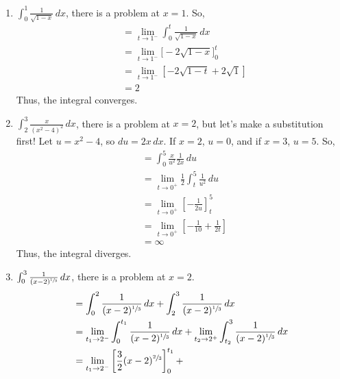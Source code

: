 \begin{Example}{}{}
    \begin{enumerate}[label=(\roman*)]
        \item $ \int_{0}^{1} \frac{1}{\sqrt{1-x}} \, d{x} $, there is a problem at $ x=1 $. So,
              \begin{align*}
                   & =\lim\limits_{{t} \to {1^-}} \int_{0}^{t} \frac{1}{\sqrt{1-x}} \, d{x} \\
                   & =\lim\limits_{{t} \to {1^-}}\bigl[-2\sqrt{1-x}\bigr]_0^t               \\
                   & =\lim\limits_{{t} \to {1^-}}[-2\sqrt{1-t}+2\sqrt{1}]                   \\
                   & =2
              \end{align*}
              Thus, the integral converges.
        \item $ \int_{2}^{3} \frac{x}{(x^2-4)^2}\, d{x}  $, there is a problem at $ x=2 $,
              but let's make a substitution first! Let $ u=x^2-4 $, so $ du=2x\,dx $. If $ x=2 $,
              $ u=0 $, and if $ x=3 $, $ u=5 $. So,
              \begin{align*}
                   & =\int_{0}^{5} \frac{x}{u^2} \frac{1}{2x} \, d{u}                           \\
                   & =\lim\limits_{{t} \to {0^+}} \frac{1}{2} \int_{t}^{5} \frac{1}{u^2}\, d{u} \\
                   & =\lim\limits_{{t} \to {0^+}}\left[-\frac{1}{2u} \right]_t^5                \\
                   & =\lim\limits_{{t} \to {0^+}}\left[ -\frac{1}{10} +\frac{1}{2t} \right]     \\
                   & =\infty
              \end{align*}
              Thus, the integral diverges.
        \item $ \int_{0}^{3} \frac{1}{(x-2)^{\sfrac{1}{3} }}\, d{x}  $, there is a problem at $ x=2 $.
              \begin{align*}
                   & =\int_{0}^{2} \frac{1}{(x-2)^{\sfrac{1}{3}}} \, d{x}+\int_{2}^{3} \frac{1}{(x-2)^{\sfrac{1}{3} }} \, d{x} \\
                   & =\lim\limits_{{t_1} \to {2^-}} \int_{0}^{t_1} \frac{1}{(x-2)^{\sfrac{1}{3}}}  \, d{x} +
                  \lim\limits_{{t_2} \to {2^+}} \int_{t_2}^{3} \frac{1}{(x-2)^{\sfrac{1}{3}}} \, d{x}                          \\
                   & =\lim\limits_{{t_1} \to {2^-}} \left[ \frac{3}{2}(x-2)^{\sfrac{2}{3}}\right]_0^{t_1}+

\end{align*}
\end{enumerate}
\end{Example}
